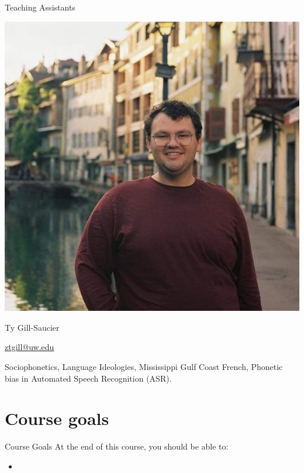 \documentclass{beamer}
\begin{document}
\begin{frame}{Teaching Assistants}
    \begin{multicols}{2}
        \begin{center}
            \includegraphics[width=0.9\linewidth]{figs/Gill_2022.jpg} %
        \end{center}
        \columnbreak
        \begin{description}[font=\bfseries]
            \item[Name:] Ty Gill-Saucier
            \item[Contact:] \href{mailto:ztgill@uw.edu}{ztgill@uw.edu}
            \item[Research Interests:] Sociophonetics, Language
            Ideologies, Mississippi Gulf Coast French, Phonetic bias in
            Automated Speech Recognition (ASR).
        \end{description}
    \end{multicols}
\end{frame}

\section{Course goals}
\begin{frame}{Course Goals}
    At the end of this course, you should be able to:
    \begin{itemize}
        \item 
    \end{itemize}
\end{frame}
\end{document}
